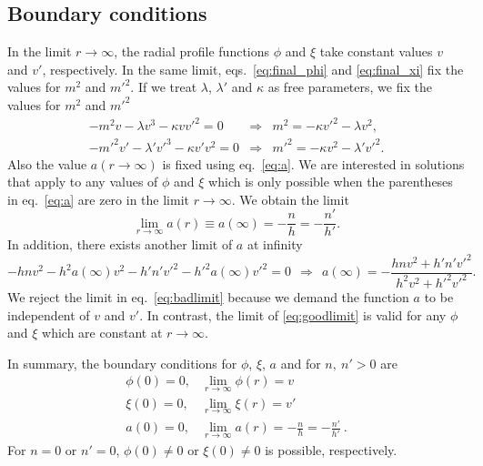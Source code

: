 \subsection{Boundary conditions}
In the limit $r\to \infty$, the radial profile functions $\phi$ and $\xi$ take constant values $v$ and $v'$, respectively. In the same limit, eqs.\ \eqref{eq:final_phi} and \eqref{eq:final_xi} fix the values for $m^2$ and $m'^2$. If we treat $\lambda$, $\lambda'$ and $\kappa$ as free parameters, we fix the values for $m^2$ and $m'^2$
\begin{eqnarray}
	\label{eq:meqs}
	-m^2v-\lambda v^3 - \kappa v v'^2 = 0 & \Rightarrow & m^2 = -\kappa v'^2 - \lambda v^2, \nonumber\\
	-m'^2v'-\lambda' v'^3 - \kappa v' v^2 = 0 & \Rightarrow  & m'^2 = -\kappa v^2 - \lambda' v'^2.
\end{eqnarray}
Also the value $a(r\to\infty)$ is fixed using eq.\ \eqref{eq:a}. We are interested in solutions that apply to any values of $\phi$ and $\xi$ which is only possible when the parentheses in eq.\ \eqref{eq:a} are zero in the limit $r\to\infty$. We obtain the limit
\begin{equation}
\lim_{r\to \infty}a(r) \equiv a(\infty) = -\frac{n}{h}=-\frac{n'}{h'}.
\label{eq:goodlimit}
\end{equation} 
In addition, there exists another limit of $a$ at infinity
\begin{equation}
	-hnv^2 - h^2a(\infty)v^2 - h' n' v'^2 - h'^2 a(\infty) v'^2 = 0 \ \ \Rightarrow  \ \ a(\infty) = -\frac{hnv^2+h'n' v'^2}{h^2v^2+h'^2 v'^2}.
	\label{eq:badlimit}
\end{equation}
We reject the limit in eq.\ \eqref{eq:badlimit} because we demand the function $a$ to be independent of $v$ and $v'$. In contrast, the limit of \eqref{eq:goodlimit} is valid for any $\phi$ and $\xi$ which are constant at $r\to\infty$.


In summary, the boundary conditions for $\phi$, $\xi$, $a$ and  for $n,\ n' > 0$ are 
\begin{eqnarray}
	\phi(0)=0, & \displaystyle\lim_{r\to\infty}\phi(r) = v \nonumber \\
	 \xi(0)=0, &  \displaystyle\lim_{r\to\infty}\xi(r) = v' \nonumber  \\
	 a(0)=0, & \displaystyle \lim_{r\to\infty}a(r) = -\frac{n}{h}=-\frac{n'}{h'}\ .
\end{eqnarray}
For $n=0$ or $n'=0$, $\phi(0)\neq 0$ or $\xi(0) \neq 0$ is possible, respectively.

